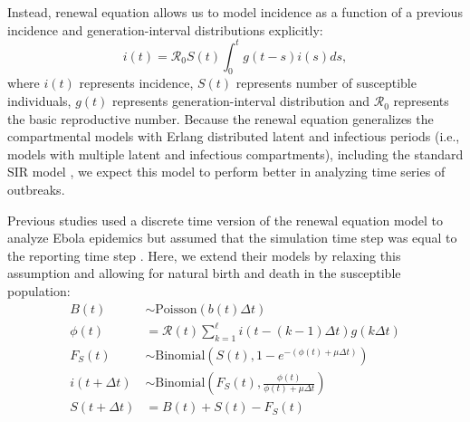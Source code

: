 \documentclass{article}
\begin{document}
Instead, renewal equation allows us to model incidence as a function of a previous incidence and generation-interval distributions explicitly:
\begin{equation}
i(t) = \mathcal R_0 S(t) \int_0^t g(t-s) i(s) ds,
\end{equation}
where $i(t)$ represents incidence, $S(t)$ represents number of susceptible individuals, $g(t)$ represents generation-interval distribution and $\mathcal R_0$ represents the basic reproductive number.
Because the renewal equation generalizes the compartmental models with Erlang distributed latent and infectious periods (i.e., models with multiple latent and infectious compartments), including the standard SIR model \citep{champredon2018equivalence}, we expect this model to perform better in analyzing time series of outbreaks.

Previous studies used a discrete time version of the renewal equation model to analyze Ebola epidemics but assumed that the simulation time step was equal to the reporting time step \citep{li2018fitting, champredon2018two}.
Here, we extend their models by relaxing this assumption and allowing for natural birth and death in the susceptible population:
\begin{equation}
\begin{aligned}
B(t) &\sim \mathrm{Poisson}(b(t) \Delta t)\\
\phi(t) &= \mathcal R(t) \sum_{k=1}^\ell i(t - (k-1) \Delta t) g(k \Delta t)\\
F_{S}(t) &\sim \mathrm{Binomial}\left(S(t), 1 - e^{-(\phi(t) + \mu \Delta t)} \right)\\
i(t + \Delta t) &\sim \mathrm{Binomial}\left(F_{S}(t), \frac{\phi(t)}{\phi(t) + \mu \Delta t} \right)\\
S(t + \Delta t) &= B(t) + S(t) - F_{S}(t)
\end{aligned}
\end{equation}
\end{document}
